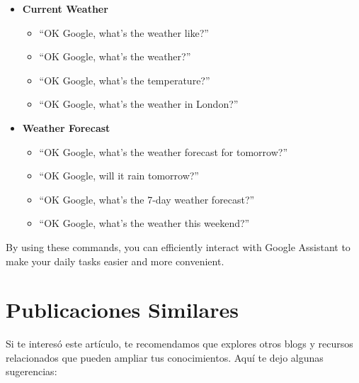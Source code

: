\documentclass[
  jou,
  floatsintext,
  longtable,
  a4paper,
  nolmodern,
  notxfonts,
  notimes,
  colorlinks=true,linkcolor=blue,citecolor=blue,urlcolor=blue]{apa7}
\providecommand{\tightlist}{%
  \setlength{\itemsep}{0pt}\setlength{\parskip}{0pt}}
\begin{document}
\begin{itemize}
\tightlist
\item
  \textbf{Current Weather}

  \begin{itemize}
  \tightlist
  \item
    ``OK Google, what's the weather like?''
  \item
    ``OK Google, what's the weather?''
  \item
    ``OK Google, what's the temperature?''
  \item
    ``OK Google, what's the weather in London?''
  \end{itemize}
\item
  \textbf{Weather Forecast}

  \begin{itemize}
  \tightlist
  \item
    ``OK Google, what's the weather forecast for tomorrow?''
  \item
    ``OK Google, will it rain tomorrow?''
  \item
    ``OK Google, what's the 7-day weather forecast?''
  \item
    ``OK Google, what's the weather this weekend?''
  \end{itemize}
\end{itemize}

By using these commands, you can efficiently interact with Google
Assistant to make your daily tasks easier and more convenient.

\section{Publicaciones Similares}\label{publicaciones-similares}

Si te interesó este artículo, te recomendamos que explores otros blogs y
recursos relacionados que pueden ampliar tus conocimientos. Aquí te dejo
algunas sugerencias:
\end{document}
